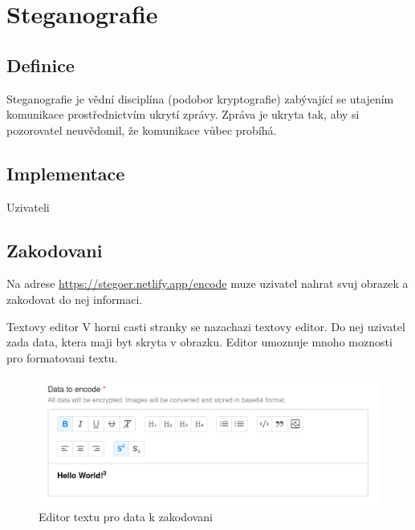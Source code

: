 
\section{Steganografie}\label{sec:steganografie}

\subsection{Definice}\label{subsec:definice}
Steganografie je vědní disciplína (podobor kryptografie) zabývající se utajením
komunikace prostřednictvím ukrytí zprávy.
Zpráva je ukryta tak, aby si pozorovatel neuvědomil,
že komunikace vůbec probíhá.\cite{wiki:steganografie}

\subsection{Implementace}\label{subsec:implementace}
Uzivateli

\subsection{Zakodovani}\label{subsec:zakodovani-dat}
Na adrese \url{https://stegoer.netlify.app/encode} muze uzivatel nahrat svuj
obrazek a zakodovat do nej informaci.

\begin{subsubsection}{Textovy editor}\label{subsubsec:textovy-editor}
V horni casti stranky se nazachazi textovy editor.
Do nej uzivatel zada data, ktera maji byt skryta v obrazku.
Editor umoznuje mnoho moznosti pro formatovani textu.

\begin{figure}
    \centering
    \includegraphics[scale=0.5]{assets/images/encode-editor}
    \caption{Editor textu pro data k zakodovani}\label{fig:editor-textu}
\end{figure}

\end{subsubsection}


